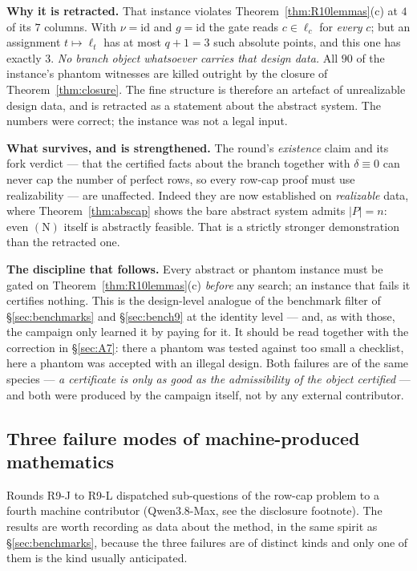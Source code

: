 \documentclass[11pt]{article}
\theoremstyle{plain}
\theoremstyle{definition}
\theoremstyle{remark}
\numberwithin{equation}{section}
\begin{document}
\textbf{Why it is retracted.} That instance violates
Theorem~\ref{thm:R10lemmas}(c) at $4$ of its $7$ columns. With
$\nu = \mathrm{id}$ and $g = \mathrm{id}$ the gate reads $c\in\ell_c$ for
\emph{every} $c$; but an assignment $t\mapsto\ell_t$ has at most $q+1 = 3$ such
absolute points, and this one has exactly $3$. \emph{No branch object whatsoever
carries that design data.} All $90$ of the instance's phantom witnesses are killed
outright by the closure of Theorem~\ref{thm:closure}. The fine structure is
therefore an artefact of unrealizable design data, and is retracted as a statement
about the abstract system. The numbers were correct; the instance was not a legal
input.

\textbf{What survives, and is strengthened.} The round's \emph{existence} claim
and its fork verdict --- that the certified facts about the branch together with
$\delta\equiv0$ can never cap the number of perfect rows, so every row-cap proof
must use realizability --- are unaffected. Indeed they are now established on
\emph{realizable} data, where Theorem~\ref{thm:abscap} shows the bare abstract
system admits $|P| = n$: even $(\mathrm{N})$ itself is abstractly feasible. That
is a strictly stronger demonstration than the retracted one.

\textbf{The discipline that follows.} Every abstract or phantom instance must be
gated on Theorem~\ref{thm:R10lemmas}(c) \emph{before} any search; an instance that
fails it certifies nothing. This is the design-level analogue of the benchmark
filter of \S\ref{sec:benchmarks} and \S\ref{sec:bench9} at the identity level ---
and, as with those, the campaign only learned it by paying for it. It should be
read together with the correction in \S\ref{sec:A7}: there a phantom was tested
against too small a checklist, here a phantom was accepted with an illegal
design. Both failures are of the same species --- \emph{a certificate is only as
good as the admissibility of the object certified} --- and both were produced by
the campaign itself, not by any external contributor.

\subsection{Three failure modes of machine-produced
mathematics}\label{sec:failmodes}

Rounds R9-J to R9-L dispatched sub-questions of the row-cap problem to a fourth
machine contributor (Qwen3.8-Max, see the disclosure footnote). The results are
worth recording as data about the method, in the same spirit as
\S\ref{sec:benchmarks}, because the three failures are of distinct kinds and only
one of them is the kind usually anticipated.
\end{document}
